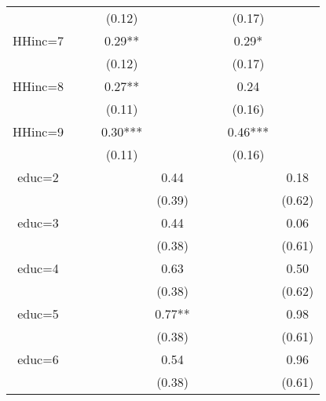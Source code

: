 \documentclass[12pt,notitlepage,onecolumn,aps,pra]{article}
\begin{document}
\begin{table}[ht]
\begin{adjustbox}{width={0.9\textwidth},totalheight={\textheight}}
\begin{threeparttable}
\begin{tabular}{ccccccccc}
             &           &           &     (0.12) &             &           &            &      (0.17) &              \\
HHinc=7      &           &           &     0.29** &             &           &            &       0.29* &              \\
             &           &           &     (0.12) &             &           &            &      (0.17) &              \\
HHinc=8      &           &           &     0.27** &             &           &            &        0.24 &              \\
             &           &           &     (0.11) &             &           &            &      (0.16) &              \\
HHinc=9      &           &           &    0.30*** &             &           &            &     0.46*** &              \\
             &           &           &     (0.11) &             &           &            &      (0.16) &              \\
educ=2       &           &           &            &        0.44 &           &            &             &         0.18 \\
             &           &           &            &      (0.39) &           &            &             &       (0.62) \\
educ=3       &           &           &            &        0.44 &           &            &             &         0.06 \\
             &           &           &            &      (0.38) &           &            &             &       (0.61) \\
educ=4       &           &           &            &        0.63 &           &            &             &         0.50 \\
             &           &           &            &      (0.38) &           &            &             &       (0.62) \\
educ=5       &           &           &            &      0.77** &           &            &             &         0.98 \\
             &           &           &            &      (0.38) &           &            &             &       (0.61) \\
educ=6       &           &           &            &        0.54 &           &            &             &         0.96 \\
             &           &           &            &      (0.38) &           &            &             &       (0.61) \\

\end{tabular}
\end{threeparttable}
\end{adjustbox}
\end{table}
\end{document}
